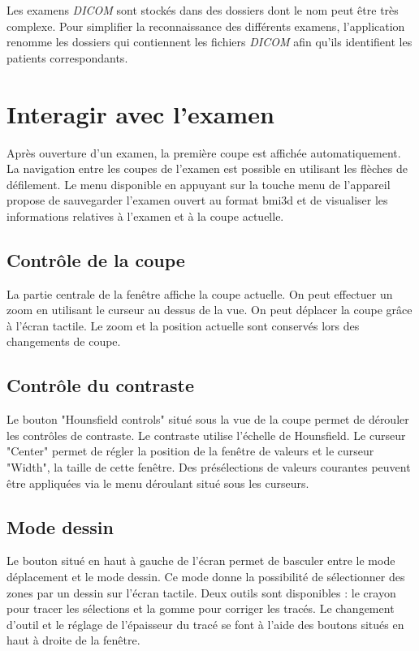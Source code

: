 \begin{note} %
Les examens \emph{DICOM} sont stockés dans des dossiers dont le nom peut être très complexe. Pour simplifier la reconnaissance des différents examens, l'application renomme les dossiers qui contiennent les fichiers \emph{DICOM} afin qu'ils identifient les patients correspondants.
\end{note}

\section{Interagir avec l'examen} \label{exam-interaction}

Après ouverture d'un examen, la première coupe est affichée automatiquement. La navigation entre les coupes de l'examen est possible en utilisant les flèches de défilement. Le menu disponible en appuyant sur la touche menu de l'appareil propose de sauvegarder l'examen ouvert au format bmi3d et de visualiser les informations relatives à l'examen et à la coupe actuelle.

\subsection{Contrôle de la coupe}
La partie centrale de la fenêtre affiche la coupe actuelle. On peut effectuer un zoom en utilisant le curseur au dessus de la vue. On peut déplacer la coupe grâce à l'écran tactile. Le zoom et la position actuelle sont conservés lors des changements de coupe.

\subsection{Contrôle du contraste}
Le bouton "Hounsfield controls" situé sous la vue de la coupe permet de dérouler les contrôles de contraste. Le contraste utilise l'échelle de Hounsfield. Le curseur "Center" permet de régler la position de la fenêtre de valeurs et le curseur "Width", la taille de cette fenêtre. Des présélections de valeurs courantes peuvent être appliquées via le menu déroulant situé sous les curseurs.

\subsection{Mode dessin}
Le bouton situé en haut à gauche de l'écran permet de basculer entre le mode déplacement et le mode dessin. Ce mode donne la possibilité de sélectionner des zones par un dessin sur l'écran tactile. Deux outils sont disponibles : le crayon pour tracer les sélections et la gomme pour corriger les tracés. Le changement d'outil et le réglage de l'épaisseur du tracé se font à l'aide des boutons situés en haut à droite de la fenêtre.